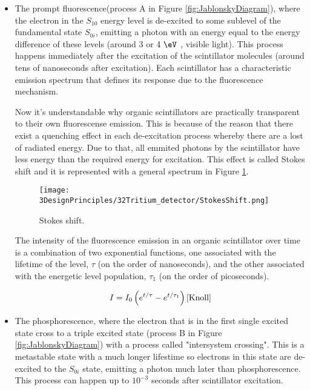 \begin{itemize}

\item{} The prompt fluorescence(process A in Figure \ref{fig:JablonskyDiagram}), where the electron in the $S_{10}$ energy level  is de-excited to some sublevel of the fundamental state $S_{0i}$, emitting a photon with an energy equal to the energy difference of these levels (around $3$ or $4~\eV$ , visible light). This process happens immediately after the excitation of the scintillator molecules (around tens of nanoseconds after excitation). Each scintillator has a characteristic emission spectrum that defines its response due to the fluorescence mechanism. 

Now it's understandable why organic scintillators are practically transparent to their own fluorescense emission. This is because of the reason that there exist a quenching effect in each de-excitation process whereby there are a lost of radiated energy. Due to that, all emmited  photons by the scintillator have less energy than the required energy for excitation. This effect is called Stokes shift and it is represented with a general spectrum in Figure \ref{fig:StokesShift}.

\begin{figure}[htbp]
\centering
\texttt{[image: 3DesignPrinciples/32Tritium\_detector/StokesShift.png]}
\caption{Stokes shift.\label{fig:StokesShift}~\cite{Knoll}}
\end{figure}

The intensity of the fluorescence emission in an organic scintillator over time is a combination of two exponential functions, one associated with the lifetime of the level, $\tau$ (on the order of nanoseconds), and the other associated with the energetic level population, $\tau_1$ (on the order of picoseconds).

\begin{equation}
I=I_0\left(e^{t/\tau} - e^{t/\tau_1}\right) \cite{Knoll}
\label{eq:IntensityTimeScintillator}
\end{equation}

\item{} The phosphorescence, where the electron that is in the first single excited state cross to a triple excited state (process B in Figure \ref{fig:JablonskyDiagram}) with a process called "intersystem crossing". This is a metastable state with a much longer lifestime so electrons in this state are de-excited to the $S_{0i}$ state, emitting a photon much later than phosphorescence. This process can happen up to $10^{-3}$ seconds after scintillator excitation.


\end{itemize}
